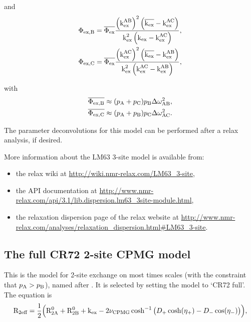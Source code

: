 and
\begin{subequations}
\begin{align}
    &\Phi_\textrm{ex,B} = \overline{\Phi_\textrm{ex}} \frac{\left(\textrm{k}_\textrm{ex}^\textrm{AB}\right)^2 \left( \overline{\textrm{k}_\textrm{ex}} - \textrm{k}_\textrm{ex}^\textrm{AC} \right)}{\textrm{k}_\textrm{ex}^2 \left( \textrm{k}_\textrm{ex} - \textrm{k}_\textrm{ex}^\textrm{AC} \right)} , \label{eq: disp phiexB} \\
    &\Phi_\textrm{ex,C} = \overline{\Phi_\textrm{ex}} \frac{\left(\textrm{k}_\textrm{ex}^\textrm{AC}\right)^2 \left( \overline{\textrm{k}_\textrm{ex}} - \textrm{k}_\textrm{ex}^\textrm{AB} \right)}{\textrm{k}_\textrm{ex}^2 \left( \textrm{k}_\textrm{ex}^\textrm{AC} - \textrm{k}_\textrm{ex}^\textrm{AB} \right)} , \label{eq: disp phiexC}
\end{align}
\end{subequations}

with
\begin{subequations}
\begin{align}
    &\overline{\Phi_\textrm{ex,B}} \approx (p_\textrm{A} + p_\textrm{C}) p_\textrm{B} \Delta\omega_\textrm{AB}^2 , \\
    &\overline{\Phi_\textrm{ex,C}} \approx (p_\textrm{A} + p_\textrm{B}) p_\textrm{C} \Delta\omega_\textrm{AC}^2 .
\end{align}
\end{subequations}

The parameter deconvolutions for this model can be performed after a relax analysis, if desired.

More information about the LM63 3-site model is available from:
\begin{itemize}
  \item the relax wiki at \url{http://wiki.nmr-relax.com/LM63\_3-site},
  \item the API documentation at \url{http://www.nmr-relax.com/api/3.1/lib.dispersion.lm63\_3site-module.html},
  \item the relaxation dispersion page of the relax website at \url{http://www.nmr-relax.com/analyses/relaxation\_dispersion.html#LM63\_3-site}.
\end{itemize}



\subsection{The full CR72 2-site CPMG model}
\label{sect: dispersion: CR72 full model}

This is the model for 2-site exchange on most times scales (with the constraint that $p_\textrm{A} > p_\textrm{B}$), named after \citet{CarverRichards72}.
It is selected by setting the model to `CR72 full'.
The equation is
\begin{equation}
    \mathrm{R}_\textrm{2eff} = \frac{1}{2} \Big( \mathrm{R}_\mathrm{2A}^0 + \mathrm{R}_\mathrm{2B}^0 + \textrm{k}_\textrm{ex} - 2\nu_\textrm{CPMG}\cosh^{-1} \big( D_+\cosh(\eta_+) - D_-\cos(\eta_-) \big) \Big) ,
\end{equation}

